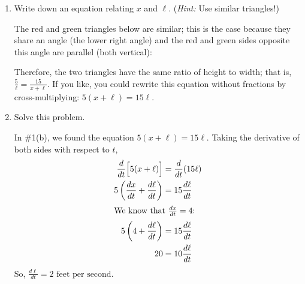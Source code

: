 \documentclass[main]{subfiles}
\begin{document}
\begin{enumerate}
\begin{enumerate}
  \item
    \begin{problem}[\vfill]
      Write down an equation relating $x$ and $\ell$.  (\emph{Hint:} Use
      similar triangles!)
    \end{problem}

    \begin{solution}
      The red and green triangles below are similar; this is the case
      because they share an angle (the lower right angle) and the red and
      green sides opposite this angle are parallel (both vertical): 
      \begin{center}
      \end{center}
      Therefore, the two triangles have the same ratio of height to width;
      that is, $\frac{5}{\ell} = \frac{15}{x + \ell}$.  If you like, you
      could rewrite this equation without fractions by cross-multiplying:
      $5 (x + \ell) = 15 \ell$.
    \end{solution}

  \item
    \begin{problem}[\nstretch{2}]
      Solve this problem.
    \end{problem}

    \begin{solution}
      In {{{{\#1}}(b)}}, we found the equation $5(x +
      \ell) = 15 \ell$.  Taking the derivative of both sides with respect
      to $t$,
      \begin{align*}
        \frac{d}{dt} \Big[ 5 (x + \ell) \Big] &= \frac{d}{dt} (15 \ell) \\
        5 \left( \frac{dx}{dt} + \frac{d\ell}{dt} \right) &= 15
        \frac{d\ell}{dt} \\
        \intertext{We know that $\frac{dx}{dt} = 4$:}
        5 \left( 4 + \frac{d\ell}{dt} \right) &= 15 \frac{d\ell}{dt} \\
        20 &= 10 \frac{d\ell}{dt} 
      \end{align*}
      So, $\frac{d\ell}{dt} = \boxed{2 \text{ feet per second}}$.


\end{solution}
\end{enumerate}
\end{enumerate}
\end{document}
